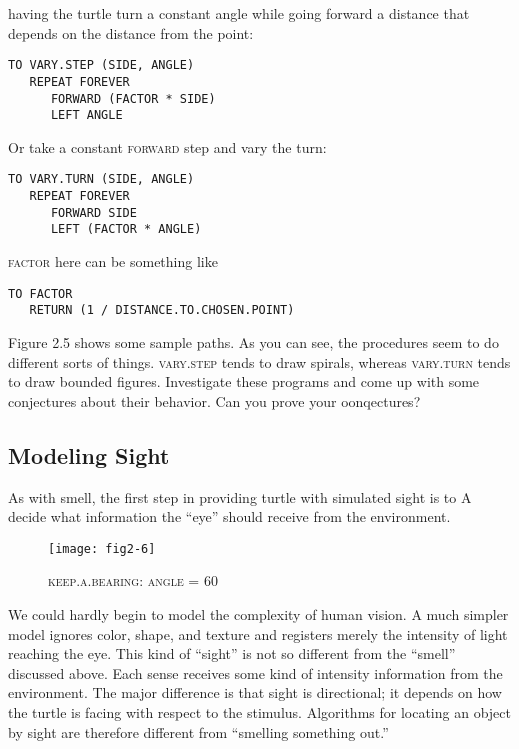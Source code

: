 \documentclass{book}
\begin{document}
having the turtle turn a constant angle while going forward a distance
that depends on the distance from the point:

\begin{verbatim}
TO VARY.STEP (SIDE, ANGLE)
   REPEAT FOREVER
      FORWARD (FACTOR * SIDE)
      LEFT ANGLE
\end{verbatim}
Or take a constant \textsc{forward} step and vary the turn:

\begin{verbatim}
TO VARY.TURN (SIDE, ANGLE)
   REPEAT FOREVER
      FORWARD SIDE
      LEFT (FACTOR * ANGLE)
\end{verbatim}
\textsc{factor} here can be something like

\begin{verbatim}
TO FACTOR
   RETURN (1 / DISTANCE.TO.CHOSEN.POINT)
\end{verbatim}
Figure 2.5 shows some sample paths. As you can see, the procedures
seem to do different sorts of things. \textsc{vary.step} tends to draw spirals,
whereas \textsc{vary.turn} tends to draw bounded figures. Investigate these
programs and come up with some conjectures about their behavior. Can
you prove your oonqectures?

\subsection{Modeling Sight}

As with smell, the first step in providing turtle with simulated sight is to
A decide what information the ``eye'' should receive from the environment.

\begin{figure}
\begin{center}
\texttt{[image: fig2-6]}
\caption{\textsc{keep.a.bearing}: \textsc{angle} = 60}
\end{center}
\end{figure}

We could hardly begin to model the complexity of human vision. A much
simpler model ignores color, shape, and texture and registers merely the
intensity of light reaching the eye. This kind of ``sight'' is not so different
from the ``smell'' discussed above. Each sense receives some kind of
intensity information from the environment. The major difference is
that sight is directional; it depends on how the turtle is facing with
respect to the stimulus. Algorithms for locating an object by sight are
therefore different from ``smelling something out.''
\end{document}
